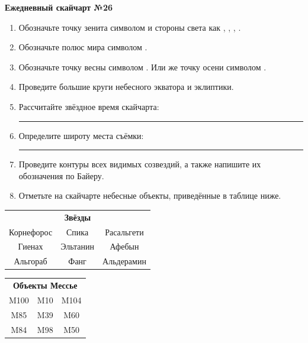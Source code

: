 \documentclass{./SAS-class-skygen}
\begin{document}
    
    
    
	\begin{center}
		\large\textbf{Ежедневный скайчарт №26}
	\end{center}

	\begin{enumerate}
		\item Обозначьте точку зенита символом  и стороны света как , , , .
		\item Обозначьте полюс мира символом .
		\item Обозначьте точку весны символом \Aries. Или же точку осени символом \Libra.
		\item Проведите большие круги небесного экватора и эклиптики.
		\item Рассчитайте звёздное время скайчарта: \rule{2cm}{0.4pt}
		\item Определите широту места съёмки: \rule{2cm}{0.4pt}
		\item Проведите контуры всех видимых созвездий, а также напишите их обозначения по Байеру.
		\item Отметьте на скайчарте небесные объекты, приведённые в таблице ниже.
	\end{enumerate}
	
    \vspace{0.5cm}

    \begin{table}[h!]
    \centering
    \begin{tabular}{ccc}
    \multicolumn{3}{c}{\textbf{Звёзды}} \\ Корнефорос & Спика & Расальгети \\
Гиенах & Эльтанин & Афебын \\
Альгораб & Фанг & Альдерамин \\

\end{tabular}
    \hfill
    \begin{tabular}{ccc}
    \multicolumn{3}{c}{\textbf{Объекты Мессье}} \\ M100 & M10 & M104 \\
M85 & M39 & M60 \\
M84 & M98 & M50 \\

\end{tabular}
    \end{table}
	
\end{document}
